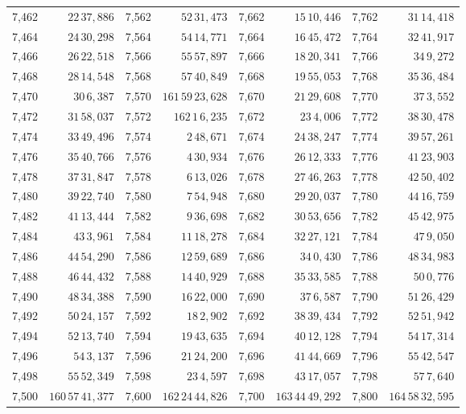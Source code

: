 \begin{tabular}{|r|r||r|r||r|r||r|r|}
7,462 & \(22\,37,\!886\) & 7,562 & \(52\,31,\!473\) & 7,662 & \(15\,10,\!446\) & 7,762 & \(31\,14,\!418\) \\
7,464 & \(24\,30,\!298\) & 7,564 & \(54\,14,\!771\) & 7,664 & \(16\,45,\!472\) & 7,764 & \(32\,41,\!917\) \\
7,466 & \(26\,22,\!518\) & 7,566 & \(55\,57,\!897\) & 7,666 & \(18\,20,\!341\) & 7,766 & \(34\,9,\!272\) \\
7,468 & \(28\,14,\!548\) & 7,568 & \(57\,40,\!849\) & 7,668 & \(19\,55,\!053\) & 7,768 & \(35\,36,\!484\) \\
7,470 & \(30\,6,\!387\) & 7,570 & \(161\,59\,23,\!628\) & 7,670 & \(21\,29,\!608\) & 7,770 & \(37\,3,\!552\) \\[1pt]
7,472 & \(31\,58,\!037\) & 7,572 & \(162\,1\,6,\!235\) & 7,672 & \(23\,4,\!006\) & 7,772 & \(38\,30,\!478\) \\
7,474 & \(33\,49,\!496\) & 7,574 & \(2\,48,\!671\) & 7,674 & \(24\,38,\!247\) & 7,774 & \(39\,57,\!261\) \\
7,476 & \(35\,40,\!766\) & 7,576 & \(4\,30,\!934\) & 7,676 & \(26\,12,\!333\) & 7,776 & \(41\,23,\!903\) \\
7,478 & \(37\,31,\!847\) & 7,578 & \(6\,13,\!026\) & 7,678 & \(27\,46,\!263\) & 7,778 & \(42\,50,\!402\) \\
7,480 & \(39\,22,\!740\) & 7,580 & \(7\,54,\!948\) & 7,680 & \(29\,20,\!037\) & 7,780 & \(44\,16,\!759\) \\[1pt]
7,482 & \(41\,13,\!444\) & 7,582 & \(9\,36,\!698\) & 7,682 & \(30\,53,\!656\) & 7,782 & \(45\,42,\!975\) \\
7,484 & \(43\,3,\!961\) & 7,584 & \(11\,18,\!278\) & 7,684 & \(32\,27,\!121\) & 7,784 & \(47\,9,\!050\) \\
7,486 & \(44\,54,\!290\) & 7,586 & \(12\,59,\!689\) & 7,686 & \(34\,0,\!430\) & 7,786 & \(48\,34,\!983\) \\
7,488 & \(46\,44,\!432\) & 7,588 & \(14\,40,\!929\) & 7,688 & \(35\,33,\!585\) & 7,788 & \(50\,0,\!776\) \\
7,490 & \(48\,34,\!388\) & 7,590 & \(16\,22,\!000\) & 7,690 & \(37\,6,\!587\) & 7,790 & \(51\,26,\!429\) \\[1pt]
7,492 & \(50\,24,\!157\) & 7,592 & \(18\,2,\!902\) & 7,692 & \(38\,39,\!434\) & 7,792 & \(52\,51,\!942\) \\
7,494 & \(52\,13,\!740\) & 7,594 & \(19\,43,\!635\) & 7,694 & \(40\,12,\!128\) & 7,794 & \(54\,17,\!314\) \\
7,496 & \(54\,3,\!137\) & 7,596 & \(21\,24,\!200\) & 7,696 & \(41\,44,\!669\) & 7,796 & \(55\,42,\!547\) \\
7,498 & \(55\,52,\!349\) & 7,598 & \(23\,4,\!597\) & 7,698 & \(43\,17,\!057\) & 7,798 & \(57\,7,\!640\) \\
7,500 & \(160\,57\,41,\!377\) & 7,600 & \(162\,24\,44,\!826\) & 7,700 & \(163\,44\,49,\!292\) & 7,800 & \(164\,58\,32,\!595\) \\
\hline
\end{tabular}\par
\endgroup
\clearpage
